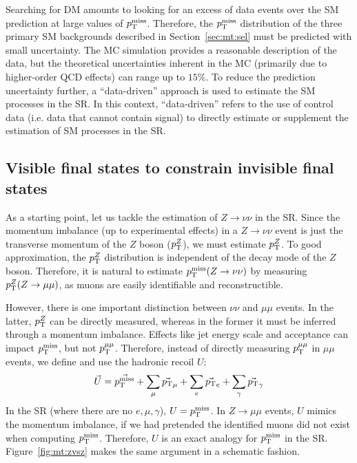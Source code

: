Searching for DM amounts to looking for an excess of data events over the SM prediction at large values of $p_\mathrm{T}^\mathrm{miss}$.
Therefore, the $p_\mathrm{T}^\mathrm{miss}$ distribution of the three primary SM backgrounds described in Section~\ref{sec:mt:sel} must be predicted with small uncertainty.
The MC simulation provides a reasonable description of the data, but the theoretical uncertainties inherent in the MC (primarily due to higher-order QCD effects) can range up to $15\%$.
To reduce the prediction uncertainty further, a ``data-driven'' approach is used to estimate the SM processes in the SR.
In this context, ``data-driven'' refers to the use of control data (i.e. data that cannot contain signal) to directly estimate or supplement the estimation of SM processes in the SR.

\subsection{Visible final states to constrain invisible final states}

As a starting point, let us tackle the estimation of $Z\rightarrow\nu\nu$ in the SR.
Since the momentum imbalance (up to experimental effects) in a $Z\rightarrow\nu\nu$ event is just the transverse momentum of the $Z$ boson ($p_\mathrm{T}^Z$), we must estimate $p_\mathrm{T}^Z$.
To good approximation, the $p_\mathrm{T}^Z$ distribution is independent of the decay mode of the $Z$ boson.
Therefore, it is natural to estimate $p_\mathrm{T}^\mathrm{miss}(Z\rightarrow\nu\nu)$ by measuring $p_\mathrm{T}^Z(Z\rightarrow\mu\mu)$, as muons are easily identifiable and reconstructible. 

However, there is one important distinction between $\nu\nu$ and $\mu\mu$ events.
In the latter, $p_\mathrm{T}^Z$ can be directly measured, whereas in the former it must be inferred through a momentum imbalance.
Effects like jet energy scale and acceptance can impact $p_\mathrm{T}^\mathrm{miss}$, but not $p_\mathrm{T}^{\mu\mu}$. 
Therefore, instead of directly measuring $p_\mathrm{T}^{\mu\mu}$ in $\mu\mu$ events, we define and use the hadronic recoil $U$:
\begin{equation}
    \vec{U} = \vec{p_\mathrm{T}^\mathrm{miss}} + \sum_{\mu} \vec{p_\mathrm{T}}_\mu + \sum_{e} \vec{p_\mathrm{T}}_e + \sum_\gamma \vec{p_\mathrm{T}}_\gamma
\end{equation}
In the SR (where there are no $e,\mu,\gamma$), $U = p_\mathrm{T}^\mathrm{miss}$.
In $Z\rightarrow\mu\mu$ events, $U$ mimics the momentum imbalance, if we had pretended the identified muons did not exist when computing $p_\mathrm{T}^\mathrm{miss}$. 
Therefore, $U$ is an exact analogy for $p_\mathrm{T}^\mathrm{miss}$ in the SR.
Figure~\ref{fig:mt:zvsz} makes the same argument in a schematic fashion. 

